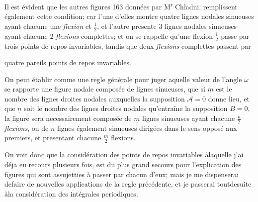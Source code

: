 \documentclass[11pt,a4paper]{article}
\begin{document}
Il est évident que les autres figures 163 données par
M\textsuperscript{r} Chladni, remplissent également cette condition;
car l'une d'elles montre quatre lignes nodales sinueuses
ayant chacune une \emph{flexion} et $\frac{1}{2}$, et l'autre
presente 3 lignes nodales sinueuses ayant chacune
2 \emph{flexions} complettes; et on se rappelle qu'une flexion
 $\frac{1}{2}$ passe par trois points de repos invariables,
tandis que deux \emph{flexions} complettes passent par


quatre pareils points de repos invariables.

On peut établir comme une regle générale pour juger
aquelle valeur de l'angle $\underline{\omega}$ se rapporte une figure
nodale composée de lignes sinueuses, que si
$\underline{m}$ est le nombre des lignes droites nodales auxquelles
la supposition $\mathcal{A}=0$ donne lieu, et que $\underline{n}$
soit le nombre des lignes droites nodales qu'entraîne
la supposition $B=0$, la figure sera
necessairement composée de $\underline{m}$ lignes sinueuses
ayant chacune $\frac{n}{2}$ \emph{flexions}, ou de $\underline{n}$ lignes
également sinueuses dirigées dans le sens opposé
aux premiers, et presentant chacune $\frac{m}{2}$ flexions.

On voit donc que la considération des points de
repos invariables àlaquelle j'ai déja eu recours plusieurs
fois, est du plus grand secours pour l'explication
des figures qui sont assujetties à passer par
chacun d'eux; mais je me dispenserai defaire
de nouvelles applications de la regle précédente, et
je passerai toutdesuite àla considération des intégrales
periodiques.
\end{document}
